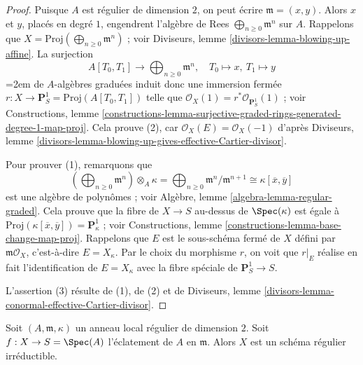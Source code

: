 \begin{proof} Puisque $A$ est régulier de dimension $2$, on peut écrire $\mathfrak m = (x, y)$. Alors $x$ et $y$, placés en degré $1$, engendrent l'algèbre de Rees $\bigoplus_{n \geq 0} \mathfrak m^n$ sur $A$. Rappelons que $X = \text{Proj}(\bigoplus_{n \geq 0} \mathfrak m^n)$ ; voir Diviseurs, lemme \ref{divisors-lemma-blowing-up-affine}. La surjection $$
A[T_0, T_1] \longrightarrow \bigoplus\nolimits_{n \geq 0} \mathfrak m^n,
\quad
T_0 \mapsto x,\ T_1 \mapsto y
$$
\begingroup\emergencystretch=2em
de $A$-algèbres graduées induit donc une immersion fermée $r : X \to \mathbf{P}^1_S = \text{Proj}(A[T_0, T_1])$ telle que $\mathcal{O}_X(1) = r^*\mathcal{O}_{\mathbf{P}^1_S}(1)$ ; voir Constructions, lemme \ref{constructions-lemma-surjective-graded-rings-generated-degree-1-map-proj}. Cela prouve (2), car $\mathcal{O}_X(E) = \mathcal{O}_X(-1)$ d'après Diviseurs, lemme \ref{divisors-lemma-blowing-up-gives-effective-Cartier-divisor}.\par\endgroup

\medskip\noindent Pour prouver (1), remarquons que $$
\left(\bigoplus\nolimits_{n \geq 0} \mathfrak m^n\right) \otimes_A \kappa =
\bigoplus\nolimits_{n \geq 0} \mathfrak m^n/\mathfrak m^{n + 1} \cong
\kappa[\overline{x}, \overline{y}]
$$ est une algèbre de polynômes ; voir Algèbre, lemme \ref{algebra-lemma-regular-graded}. Cela prouve que la fibre de $X \to S$ au-dessus de $\Spec(\kappa)$ est égale à $\text{Proj}(\kappa[\overline{x}, \overline{y}]) = \mathbf{P}^1_\kappa$ ; voir Constructions, lemme \ref{constructions-lemma-base-change-map-proj}. Rappelons que $E$ est le sous-schéma fermé de $X$ défini par $\mathfrak m\mathcal{O}_X$, c'est-à-dire $E = X_\kappa$. Par le choix du morphisme $r$, on voit que $r|_E$ réalise en fait l'identification de $E = X_\kappa$ avec la fibre spéciale de $\mathbf{P}^1_S \to S$.

\medskip\noindent L'assertion (3) résulte de (1), de (2) et de Diviseurs, lemme \ref{divisors-lemma-conormal-effective-Cartier-divisor}. \end{proof}

\begin{lemma} \label{lemma-blowup-regular} Soit $(A, \mathfrak m, \kappa)$ un anneau local régulier de dimension $2$. Soit $f : X \to S = \Spec(A)$ l'éclatement de $A$ en $\mathfrak m$. Alors $X$ est un schéma régulier irréductible. \end{lemma}

